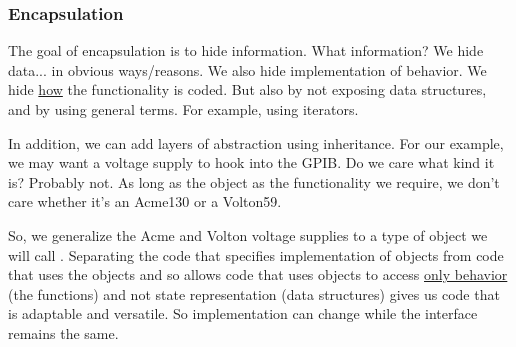 \subsubsection{Encapsulation}

The goal of encapsulation is to hide information. What information? We hide data... in obvious ways/reasons. We also hide implementation of behavior. We hide \underline{how} the functionality is coded. But also by not exposing data structures, and by using general terms. For example, using iterators.

In addition, we can add layers of abstraction using inheritance. For our example, we may want a voltage supply to hook into the GPIB. Do we care what kind it is? Probably not. As long as the object as the functionality we require, we don't care whether it's an Acme130 or a Volton59.

So, we generalize the Acme and Volton voltage supplies to a type of object we will call . Separating the code that specifies implementation of objects from code that uses the objects and so allows code that uses objects to access \underline{only behavior} (the functions) and not state representation (data structures) gives us code that is adaptable and versatile. So implementation can change while the interface remains the same.